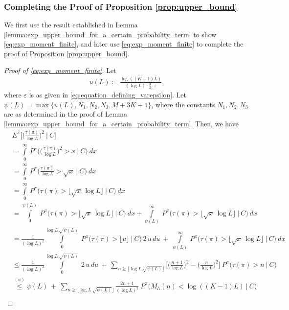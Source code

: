 \subsubsection{Completing the Proof of Proposition \ref{prop:upper_bound}}
We first use the result established in Lemma \ref{lemma:exp_upper_bound_for_a_certain_probability_term} to show \eqref{eq:exp_moment_finite}, and later use \eqref{eq:exp_moment_finite} to complete the proof of Proposition \ref{prop:upper_bound}.
\begin{proof}[Proof of \eqref{eq:exp_moment_finite}]
Let
\begin{align}
	u(L)\coloneqq \frac{\log ((K-1)L)}{(\log L)\cdot	\frac{3}{2}\cdot \varepsilon},
	\label{eq:u(L)}
\end{align}
where $\varepsilon$ is as given in \eqref{eq:equation_defining_varepsilon}. Let $\psi(L)=\max\{u(L), N_1, N_2, N_3, M+3K+1\}$, where the constants $N_1, N_2, N_3$ are as determined in the proof of Lemma \ref{lemma:exp_upper_bound_for_a_certain_probability_term}. Then, we have
\begin{align}
	& E^\pi\bigg[\bigg(\frac{\tau(\pi)}{\log L}\bigg)^2~\bigg|~C\bigg]\nonumber\\
	&=\int\limits_{0}^{\infty}~P^\pi\bigg(\bigg(\frac{\tau(\pi)}{\log L}\bigg)^2>x~\bigg|~C\bigg)~dx\nonumber\\
	&=\int\limits_{0}^{\infty}~P^\pi\bigg(\frac{\tau(\pi)}{\log L}>\sqrt{x}~\bigg|~C\bigg)~dx\nonumber\\
	&=\int\limits_{0}^{\infty}~P^\pi\bigg(\tau(\pi)> \lfloor\sqrt{x}\,\log L\rfloor~\bigg|~C\bigg)~dx\nonumber\\
	&=\int\limits_{0}^{\psi(L)}~P^\pi\bigg(\tau(\pi)> \lfloor\sqrt{x}\,\log L\rfloor~\bigg|~C\bigg)~dx + \int\limits_{\psi(L)}^{\infty}~P^\pi\bigg(\tau(\pi)> \lfloor\sqrt{x}\,\log L\rfloor~\bigg|~C\bigg)~dx\nonumber\\
	&= \frac{1}{(\log L)^2}\int\limits_{0}^{\log L\,\sqrt{\psi(L)}}~P^\pi\bigg(\tau(\pi)>\lfloor u \rfloor~\bigg|~C\bigg)\,2\,u\,du~+~\int\limits_{\psi(L)}^{\infty}~P^\pi\bigg(\tau(\pi)> \lfloor\sqrt{x}\,\log L\rfloor~\bigg|~C\bigg)~dx\nonumber\\
	&\leq  \frac{1}{(\log L)^2}\int\limits_{0}^{\log L\,\sqrt{\psi(L)}}~2\,u\,du ~+~\sum\limits_{n\geq \lfloor \log L\,\sqrt{\psi(L)}\rfloor} \bigg[\bigg(\frac{n+1}{\log L}\bigg)^2-\bigg(\frac{n}{\log L}\bigg)^2\bigg]~P^\pi\bigg(\tau(\pi)>n~\bigg|~C\bigg)\nonumber\\
	&\stackrel{(a)}{\leq} \psi(L)~+~\sum\limits_{n\geq \lfloor \log L\,\sqrt{\psi(L)}\rfloor} \frac{2n+1}{(\log L)^2}~P^\pi\bigg(M_h(n) < \log((K-1)L)~\bigg|~C\bigg)\nonumber\\

\end{align}
\end{proof}
